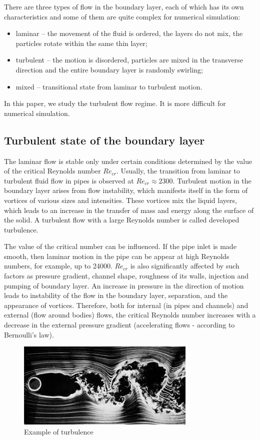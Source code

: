 	There are three types of flow in the boundary layer, each of which has its own characteristics and some of them are quite complex for numerical simulation:
	\begin{itemize}
		\item laminar -- the movement of the fluid is ordered, the layers do not mix, the particles rotate within the same thin layer;
		\item turbulent -- the motion is disordered, particles are mixed in the transverse direction and the entire boundary layer is randomly swirling;
		\item mixed -- transitional state from laminar to turbulent motion.
	\end{itemize}
	In this paper, we study the turbulent flow regime. It is more difficult for numerical simulation.
	
\subsection{Turbulent state of the boundary layer}
	The laminar flow is stable only under certain conditions determined by the value of the critical Reynolds number $Re_{cr}$. Usually, the transition from laminar to turbulent fluid flow in pipes is observed at $Re_{cr} \approx 2300$. Turbulent motion in the boundary layer arises from flow instability, which manifests itself in the form of vortices of various sizes and intensities. These vortices mix the liquid layers, which leads to an increase in the transfer of mass and energy along the surface of the solid. A turbulent flow with a large Reynolds number is called developed turbulence.
	
	The value of the critical number can be influenced. If the pipe inlet is made smooth, then laminar motion in the pipe can be appear at high Reynolds numbers, for example, up to 24000. $Re_{cr}$ is also significantly affected by such factors as pressure gradient, channel shape, roughness of its walls, injection and pumping of boundary layer. An increase in pressure in the direction of motion leads to instability of the flow in the boundary layer, separation, and the appearance of vortices. Therefore, both for internal (in pipes and channels) and external (flow around bodies) flows, the critical Reynolds number increases with a decrease in the external pressure gradient (accelerating flows - according to Bernoulli's law).
	
	\begin{figure}[H]
		\centering
		\includegraphics[width=0.7\linewidth]{../Assets/turb}
		\caption{Example of turbulence}
		\label{fig:turb}
	\end{figure}
	
